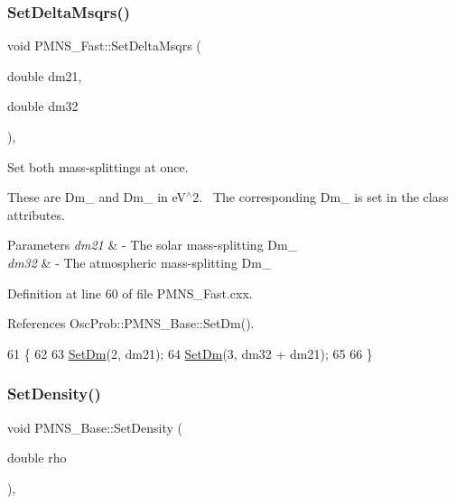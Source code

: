 \subsubsection{\texorpdfstring{Set\+Delta\+Msqrs()}{SetDeltaMsqrs()}}
{\footnotesize\ttfamily void P\+M\+N\+S\+\_\+\+Fast\+::\+Set\+Delta\+Msqrs (\begin{DoxyParamCaption}\item[{double}]{dm21,  }\item[{double}]{dm32 }\end{DoxyParamCaption})\hspace{0.3cm}{\ttfamily [virtual]}, {\ttfamily [inherited]}}

Set both mass-\/splittings at once.

These are Dm\+\_ and Dm\+\_ in e\+V$^\wedge$2.~\newline
The corresponding Dm\+\_ is set in the class attributes.


\begin{DoxyParams}{Parameters}
{\em dm21} & -\/ The solar mass-\/splitting Dm\+\_ \\
\hline
{\em dm32} & -\/ The atmospheric mass-\/splitting Dm\+\_ \\
\hline
\end{DoxyParams}


Definition at line 60 of file P\+M\+N\+S\+\_\+\+Fast.\+cxx.



References Osc\+Prob\+::\+P\+M\+N\+S\+\_\+\+Base\+::\+Set\+Dm().


\begin{DoxyCode}
61 \{
62 
63   \hyperlink{classOscProb_1_1PMNS__Base_a492243b22fb1b783cd2943f507cff970}{SetDm}(2, dm21);
64   \hyperlink{classOscProb_1_1PMNS__Base_a492243b22fb1b783cd2943f507cff970}{SetDm}(3, dm32 + dm21);
65 
66 \}
\end{DoxyCode}
\mbox{\label{classOscProb_1_1PMNS__Base_ac74206f349687da141392c81e2ba6b0d}} 
\subsubsection{\texorpdfstring{Set\+Density()}{SetDensity()}\hspace{0.1cm}{\footnotesize\ttfamily [1/2]}}
{\footnotesize\ttfamily void P\+M\+N\+S\+\_\+\+Base\+::\+Set\+Density (\begin{DoxyParamCaption}\item[{double}]{rho }\end{DoxyParamCaption})\hspace{0.3cm}{\ttfamily [virtual]}, {\ttfamily [inherited]}}

